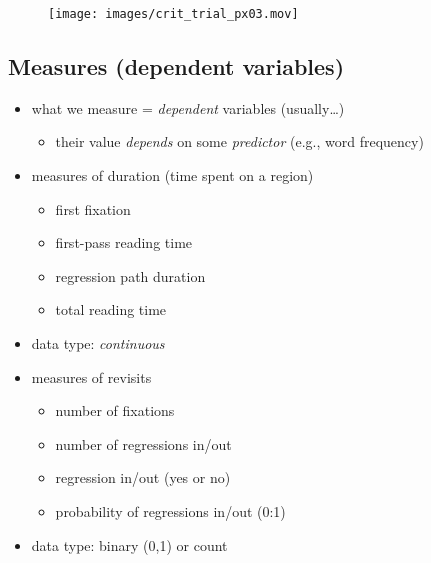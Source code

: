 \documentclass[
  letterpaper,
  DIV=11,
  numbers=noendperiod]{scrartcl}
\providecommand{\tightlist}{%
  \setlength{\itemsep}{0pt}\setlength{\parskip}{0pt}}\usepackage{longtable,booktabs,array}
\begin{document}
\begin{figure}

{\centering \texttt{[image: images/crit\_trial\_px03.mov]}

}

\end{figure}

\hypertarget{measures-dependent-variables}{%
\subsection{Measures (dependent
variables)}\label{measures-dependent-variables}}

\begin{itemize}
\tightlist
\item
  what we measure = \emph{dependent} variables (usually\ldots)

  \begin{itemize}
  \tightlist
  \item
    their value \emph{depends} on some \emph{predictor} (e.g., word
    frequency)
  \end{itemize}
\end{itemize}

\begin{itemize}
\tightlist
\item
  measures of duration (time spent on a region)

  \begin{itemize}
  \tightlist
  \item
    first fixation
  \item
    first-pass reading time
  \item
    regression path duration
  \item
    total reading time
  \end{itemize}
\item
  data type: \emph{continuous}
\end{itemize}

\begin{itemize}
\tightlist
\item
  measures of revisits

  \begin{itemize}
  \tightlist
  \item
    number of fixations
  \item
    number of regressions in/out
  \item
    regression in/out (yes or no)
  \item
    probability of regressions in/out (0:1)
  \end{itemize}
\item
  data type: binary (0,1) or count
\end{itemize}
\end{document}

